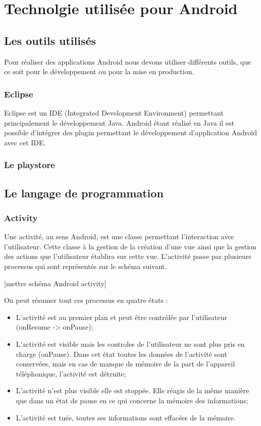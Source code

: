 \section{Technolgie utilisée pour Android}

\subsection{Les outils utilisés}

Pour réaliser des applications Android nous devons utiliser différents outils, que ce soit pour le développement ou pour la mise en production.

\subsubsection{Eclipse}

Eclipse est un IDE (Integrated Development Environment) permettant principalement le développement Java. Android étant réalisé en Java il est possible d'intégrer des plugin permettant le développement d'application Android avec cet IDE.

\subsubsection{Le playstore}

\subsection{Le langage de programmation}

\subsubsection{Activity}

Une activité, au sens Android, est une classe permettant l’interaction avec l'utilisateur. Cette classe à la gestion de la création d'une vue ainsi que la gestion des actions que l'utilisateur établira sur cette vue. L'activité passe par plusieurs processus qui sont représentés sur le schéma suivant.

[mettre schéma Android activity]

On peut résumer tout ces processus en quatre états :
\begin{itemize}
	\item L'activité est au premier plan et peut être contrôlée par l'utilisateur (onResume -> onPause);
	\item L'activité est visible mais les controles de l'utilisateur ne sont plus pris en charge (onPause). Dans cet état toutes les données de l'activité sont conservées, mais en cas de manque de mémoire de la part de l'appareil téléphonique, l'activité est détruite;
	\item L'activité n'est plus visible elle est stoppée. Elle réagis de la même manière que dans un état de pause en ce qui concerne la mémoire des informations;
	\item L'activité est tuée, toutes ses informations sont effacées de la mémoire.
\end{itemize}

